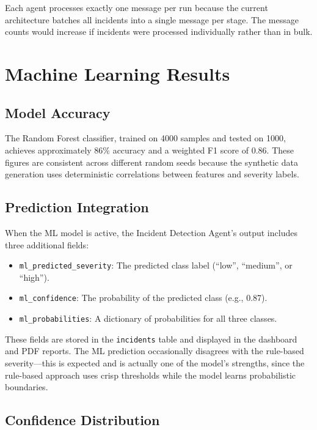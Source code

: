 Each agent processes exactly one message per run because the current architecture batches all incidents into a single message per stage. The message counts would increase if incidents were processed individually rather than in bulk.

\section{Machine Learning Results}
\label{sec:ml_results}

\subsection{Model Accuracy}

The Random Forest classifier, trained on 4000 samples and tested on 1000, achieves approximately 86\% accuracy and a weighted F1 score of 0.86. These figures are consistent across different random seeds because the synthetic data generation uses deterministic correlations between features and severity labels.

\subsection{Prediction Integration}

When the ML model is active, the Incident Detection Agent's output includes three additional fields:

\begin{itemize}[leftmargin=*]
    \item \texttt{ml\_predicted\_severity}: The predicted class label (``low'', ``medium'', or ``high'').
    \item \texttt{ml\_confidence}: The probability of the predicted class (e.g., 0.87).
    \item \texttt{ml\_probabilities}: A dictionary of probabilities for all three classes.
\end{itemize}

These fields are stored in the \texttt{incidents} table and displayed in the dashboard and PDF reports. The ML prediction occasionally disagrees with the rule-based severity---this is expected and is actually one of the model's strengths, since the rule-based approach uses crisp thresholds while the model learns probabilistic boundaries.

\subsection{Confidence Distribution}

